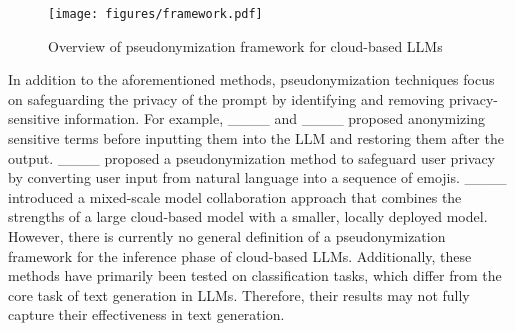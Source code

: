 \begin{figure*}[th]
    \centering
    \vspace{-0.2cm}
    \texttt{[image: figures/framework.pdf]}
    \caption{Overview of pseudonymization framework for cloud-based LLMs}
    \vspace{-0.2cm}
    \label{fig:framework}
\end{figure*}

In addition to the aforementioned methods, pseudonymization techniques focus on safeguarding the privacy of the prompt by identifying and removing privacy-sensitive information.
For example, ____ and ____ proposed anonymizing sensitive terms before inputting them into the LLM and restoring them after the output.
____ proposed a pseudonymization method to safeguard user privacy by converting user input from natural language into a sequence of emojis.
____ introduced a mixed-scale model collaboration approach that combines the strengths of a large cloud-based model with a smaller, locally deployed model.
However, there is currently no general definition of a pseudonymization framework for the inference phase of cloud-based LLMs.
Additionally, these methods have primarily been tested on classification tasks, which differ from the core task of text generation in LLMs. Therefore, their results may not fully capture their effectiveness in text generation.

%